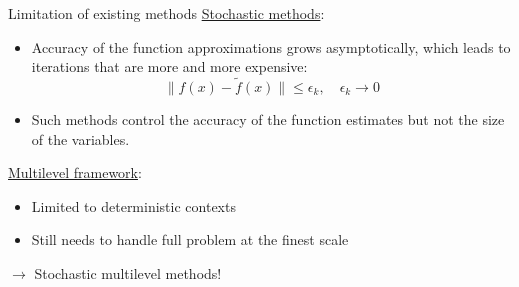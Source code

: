 \documentclass{beamer}
\begin{document}
 \begin{frame}{Limitation of existing methods}
 \underline{Stochastic methods}: 
 \begin{itemize}
 \item 
 Accuracy of the function approximations \alert{grows} asymptotically, which leads to iterations that are more and more expensive:
 $$
 \|f(x)-\tilde f(x)\|\leq \epsilon_k, \quad \epsilon_k\rightarrow 0
 $$
  \item Such methods control the accuracy of the function estimates but not the \alert{size of the variables}.   
 \end{itemize}
 \vspace{0.5cm}
 

\underline{Multilevel framework}:
\begin{itemize}
 \item Limited to \alert{deterministic} contexts
 \item Still needs to handle \alert{full problem} at the finest scale
 \end{itemize}
 
 \pause
 \begin{center}
 $\rightarrow$ \alert{Stochastic multilevel methods!}
 \end{center}
 \end{frame}
 
 
\end{document}
